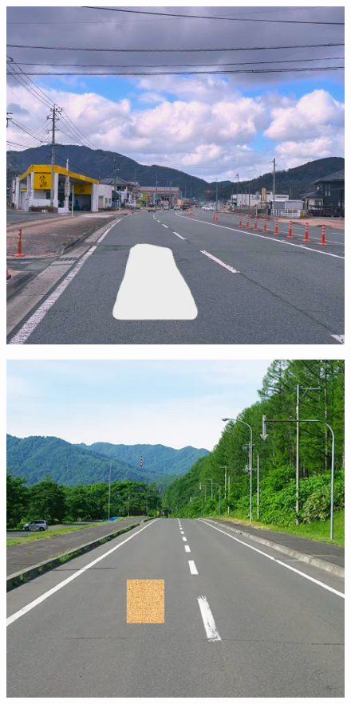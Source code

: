 \documentclass[paper]{ieicej}
\begin{document}
\begin{figure}[tb]
  \begin{minipage}[]{0.32\columnwidth}
    \centering
    \includegraphics[width=0.9\columnwidth]{figures/Ex_pr2.png}
    \label{fig:3-2-2}
  \end{minipage}
  \begin{minipage}[]{0.32\linewidth}
    \centering
    \includegraphics[width=0.9\columnwidth]{figures/Ex_re3.png}

\end{minipage}
\end{figure}
\end{document}
